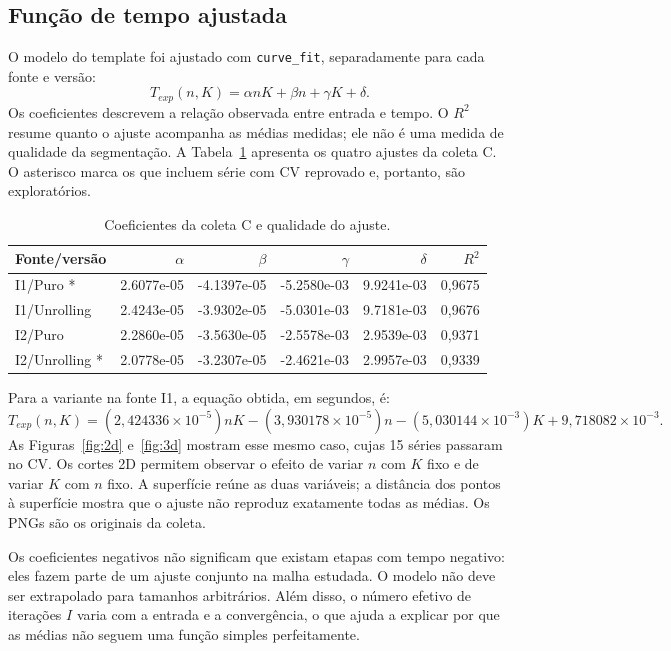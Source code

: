 \documentclass[11pt,a4paper]{article}
\begin{document}
\subsection{Função de tempo ajustada}
O modelo do template \cite{template} foi ajustado com \texttt{curve\_fit},
separadamente para cada fonte e versão:
\begin{equation}
 T_{exp}(n,K)=\alpha nK+\beta n+\gamma K+\delta.
\end{equation}
Os coeficientes descrevem a relação observada entre entrada e tempo.
O $R^2$ resume quanto o ajuste acompanha as médias medidas; ele não é uma
medida de qualidade da segmentação. A Tabela~\ref{tab:modelos} apresenta os
quatro ajustes da coleta C. O asterisco marca os que incluem série com CV
reprovado e, portanto, são exploratórios.
\begin{table}[htbp]\centering\footnotesize
\caption{Coeficientes da coleta C e qualidade do ajuste.}
\label{tab:modelos}
\begin{tabular}{@{}lrrrrr@{}}\toprule
Fonte/versão & $\alpha$ & $\beta$ & $\gamma$ & $\delta$ & $R^2$\\\midrule
I1/Puro * & 2.6077e-05 & -4.1397e-05 & -5.2580e-03 & 9.9241e-03 & 0,9675 \\
I1/Unrolling & 2.4243e-05 & -3.9302e-05 & -5.0301e-03 & 9.7181e-03 & 0,9676 \\
I2/Puro & 2.2860e-05 & -3.5630e-05 & -2.5578e-03 & 2.9539e-03 & 0,9371 \\
I2/Unrolling * & 2.0778e-05 & -3.2307e-05 & -2.4621e-03 & 2.9957e-03 & 0,9339 \\
\bottomrule\end{tabular}
\end{table}

Para a variante na fonte I1, a equação obtida, em segundos, é:
\[
 T_{exp}(n,K)=(2{,}424336\!\times\!10^{-5})nK
 -(3{,}930178\!\times\!10^{-5})n
 -(5{,}030144\!\times\!10^{-3})K+9{,}718082\!\times\!10^{-3}.
\]
As Figuras~\ref{fig:2d} e~\ref{fig:3d} mostram esse mesmo caso, cujas
15 séries passaram no CV. Os cortes 2D permitem observar o efeito de variar
$n$ com $K$ fixo e de variar $K$ com $n$ fixo. A superfície reúne as duas
variáveis; a distância dos pontos à superfície mostra que o ajuste não
reproduz exatamente todas as médias. Os PNGs são os originais da coleta.

Os coeficientes negativos não significam que existam etapas com tempo negativo:
eles fazem parte de um ajuste conjunto na malha estudada. O modelo não deve
ser extrapolado para tamanhos arbitrários. Além disso, o número efetivo de
iterações $I$ varia com a entrada e a convergência, o que ajuda a explicar
por que as médias não seguem uma função simples perfeitamente.
\end{document}
